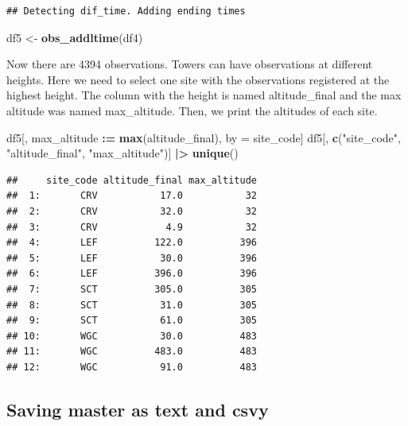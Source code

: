 \documentclass[preprint, 3p,
authoryear]{elsarticle} %
\newenvironment{Shaded}{\begin{snugshade}}{\end{snugshade}}
\newcommand{\FunctionTok}[1]{\textcolor[rgb]{0.13,0.29,0.53}{\textbf{#1}}}
\newcommand{\NormalTok}[1]{#1}
\newcommand{\OtherTok}[1]{\textcolor[rgb]{0.56,0.35,0.01}{#1}}
\newcommand{\SpecialCharTok}[1]{\textcolor[rgb]{0.81,0.36,0.00}{\textbf{#1}}}
\newcommand{\StringTok}[1]{\textcolor[rgb]{0.31,0.60,0.02}{#1}}
\begin{document}
\begin{verbatim}
## Detecting dif_time. Adding ending times
\end{verbatim}

\begin{Shaded}
\begin{Highlighting}[]
\NormalTok{df5 }\OtherTok{\textless{}{-}} \FunctionTok{obs\_addltime}\NormalTok{(df4)}
\end{Highlighting}
\end{Shaded}

Now there are 4394 observations. Towers can have observations at
different heights. Here we need to select one site with the observations
registered at the highest height. The column with the height is named
altitude\_final and the max altitude was named max\_altitude. Then, we
print the altitudes of each site.

\begin{Shaded}
\begin{Highlighting}[]
\NormalTok{df5[,}
\NormalTok{    max\_altitude }\SpecialCharTok{:=} \FunctionTok{max}\NormalTok{(altitude\_final),}
\NormalTok{    by }\OtherTok{=}\NormalTok{ site\_code]}
\NormalTok{df5[,}
    \FunctionTok{c}\NormalTok{(}\StringTok{"site\_code"}\NormalTok{,}
      \StringTok{"altitude\_final"}\NormalTok{,}
      \StringTok{"max\_altitude"}\NormalTok{)] }\SpecialCharTok{|\textgreater{}} \FunctionTok{unique}\NormalTok{()}
\end{Highlighting}
\end{Shaded}

\begin{verbatim}
##     site_code altitude_final max_altitude
##  1:       CRV           17.0           32
##  2:       CRV           32.0           32
##  3:       CRV            4.9           32
##  4:       LEF          122.0          396
##  5:       LEF           30.0          396
##  6:       LEF          396.0          396
##  7:       SCT          305.0          305
##  8:       SCT           31.0          305
##  9:       SCT           61.0          305
## 10:       WGC           30.0          483
## 11:       WGC          483.0          483
## 12:       WGC           91.0          483
\end{verbatim}

\hypertarget{saving-master-as-text-and-csvy}{%
\subsection{Saving master as text and
csvy}\label{saving-master-as-text-and-csvy}}
\end{document}
